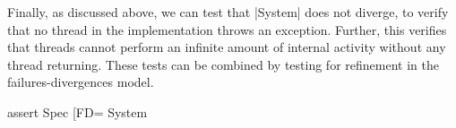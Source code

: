 Finally, as discussed above, we can test that |System| does not diverge, to
verify that no thread in the implementation throws an exception.  Further,
this verifies that threads cannot perform an infinite amount of internal
activity without any thread returning.  These tests can be combined by testing
for refinement in the failures-divergences model.
%
\begin{cspm}
assert Spec [FD= System
\end{cspm}

